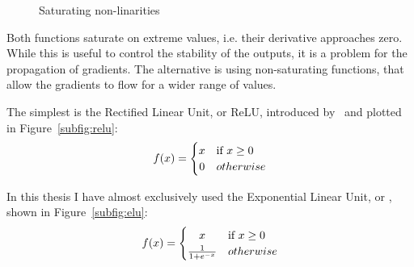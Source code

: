 \begin{figure}[tb]
	\hfil
	\caption{Saturating non-linarities}\label{fig:non_linear}
\end{figure}

Both functions saturate on extreme values, 
i.e. their derivative approaches zero.
While this is useful to control the stability of the outputs, it is a problem for the propagation of gradients.
The alternative is using non-saturating functions, that allow the gradients to flow for a wider range of values.

The simplest is the Rectified Linear Unit, or ReLU, introduced by~\citet{relu} and plotted in Figure~\ref{subfig:relu}:
\begin{equation*}
f(x) =  \begin{cases}
\hfil x &  \text{if } x \geq 0 \\
\hfil 0 & otherwise
\end{cases}
\end{equation*}

In this thesis I have almost exclusively used the Exponential Linear Unit, or \ELU, shown in Figure~\ref{subfig:elu}:
\begin{equation*}
f(x) =  \begin{cases}
\hfil x &  \text{if } x \geq 0 \\
\frac{1}{1 + e^{-x}} & otherwise
\end{cases}
\end{equation*}

